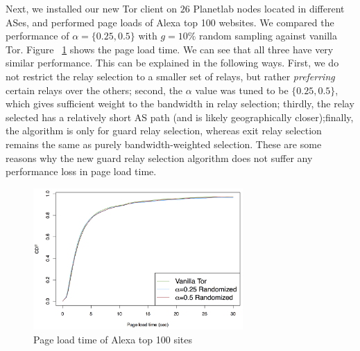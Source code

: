 Next, we installed our new Tor client on $26$ Planetlab nodes located in different ASes, and performed page loads of Alexa top 100 websites. We compared the performance of $\alpha=\{0.25,0.5\}$ with $g=10\%$ random sampling against vanilla Tor. Figure ~\ref{fig_pageload} shows the page load time. We can see that all three have very similar performance. This can be explained in the following ways. First, we do not restrict the relay selection to a smaller set of relays, but rather \emph{preferring} certain relays over the others; second, the $\alpha$ value was tuned to be $\{0.25,0.5\}$, which gives sufficient weight to the bandwidth in relay selection; thirdly, the relay selected has a relatively short AS path (and is likely geographically closer);finally, the algorithm is only for guard relay selection, whereas exit relay selection remains the same as purely bandwidth-weighted selection. These are some reasons why the new guard relay selection algorithm does not suffer any performance loss in page load time. 

\begin{figure}[ht!]
\centering
\includegraphics[width=80mm]{figure/pageloadtime}
\caption{Page load time of Alexa top 100 sites \label{fig_pageload}}
\end{figure}



